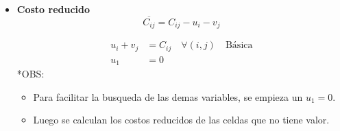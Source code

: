 \documentclass{templateNote}
\begin{document}
\begin{itemize}
    \item \textbf{Costo reducido}
    \begin{equation*}
        \overline{C_{ij}} = C_{ij} - u_i - v_j
    \end{equation*}

    \begin{align*}
        u_i + v_j &= C_{ij} \quad \forall (i,j) \quad \text{Básica} \\
        u_1 &= 0
    \end{align*}
    *OBS:
    \begin{itemize}
        \item Para facilitar la busqueda de las demas variables, se empieza un $u_1 = 0$.
        \item Luego se calculan los costos reducidos de las celdas que no tiene valor.
    \end{itemize}
\end{itemize}

\newpage
\end{document}
